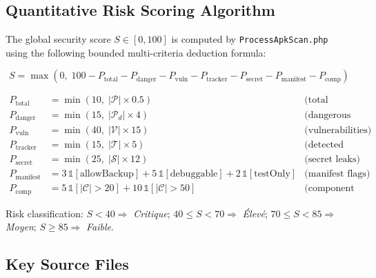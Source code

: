 \documentclass[3p,times]{elsarticle}
\begin{document}
\subsection{Quantitative Risk Scoring Algorithm}

The global security score $S \in [0, 100]$ is computed by
\texttt{ProcessApkScan.php} using the following bounded multi-criteria
deduction formula:

\begin{equation}
S = \max\!\left(0,\; 100
  - P_{\text{total}} - P_{\text{danger}}
  - P_{\text{vuln}} - P_{\text{tracker}}
  - P_{\text{secret}} - P_{\text{manifest}}
  - P_{\text{comp}}
\right)
\end{equation}

\begin{align}
P_{\text{total}}   &= \min(10,\; |\mathcal{P}| \times 0.5)
  &\text{(total permissions)} \\
P_{\text{danger}}  &= \min(15,\; |\mathcal{P}_d| \times 4)
  &\text{(dangerous permissions)} \\
P_{\text{vuln}}    &= \min(40,\; |\mathcal{V}| \times 15)
  &\text{(vulnerabilities)} \\
P_{\text{tracker}} &= \min(15,\; |\mathcal{T}| \times 5)
  &\text{(detected trackers)} \\
P_{\text{secret}}  &= \min(25,\; |\mathcal{S}| \times 12)
  &\text{(secret leaks)} \\
P_{\text{manifest}}&= 3\,\mathbb{1}[\text{allowBackup}]
                    + 5\,\mathbb{1}[\text{debuggable}]
                    + 2\,\mathbb{1}[\text{testOnly}]
  &\text{(manifest flags)} \\
P_{\text{comp}}    &= 5\,\mathbb{1}[|\mathcal{C}|>20]
                    + 10\,\mathbb{1}[|\mathcal{C}|>50]
  &\text{(component complexity)}
\end{align}

Risk classification: $S < 40 \Rightarrow$ \textit{Critique};
$40 \le S < 70 \Rightarrow$ \textit{\'{E}lev\'{e}};
$70 \le S < 85 \Rightarrow$ \textit{Moyen};
$S \ge 85 \Rightarrow$ \textit{Faible}.

\subsection{Key Source Files}
\end{document}
